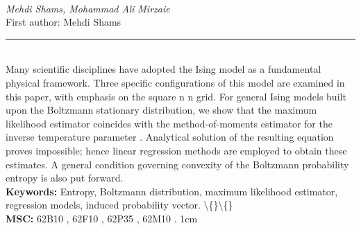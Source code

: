 \documentclass[10pt,twoside]{article}
\begin{document}
\noindent\begin{minipage}[t][\textheight]{\textwidth}
\\[0.35em]
{\itshape Mehdi Shams, Mohammad Ali Mirzaie}\\[0.2em]
{\footnotesize First author: Mehdi Shams}\\[0.45em]
\noindent\rule{\textwidth}{0.3pt}\\[0.4em]
{\footnotesize  Many scientific disciplines have adopted the Ising model as a fundamental physical framework. Three specific configurations of this model are examined in this paper, with emphasis on the square n n grid. For general Ising models built upon the Boltzmann stationary distribution, we show that the maximum likelihood estimator coincides with the method-of-moments estimator for the inverse temperature parameter . Analytical solution of the resulting equation proves impossible; hence linear regression methods are employed to obtain these estimates. A general condition governing convexity of the Boltzmann probability entropy is also put forward.}\\[0.4em]
{\footnotesize\bfseries Keywords:} {\footnotesize Entropy, Boltzmann distribution, maximum likelihood estimator, regression models, induced probability vector. \textbackslash\{\}\textbackslash\{\}}\\[0.15em]
{\footnotesize\bfseries MSC:} {\footnotesize 62B10 , 62F10 , 62P35 , 62M10 . 1cm}\\
\vfill
\end{minipage}
\newpage
\end{document}
